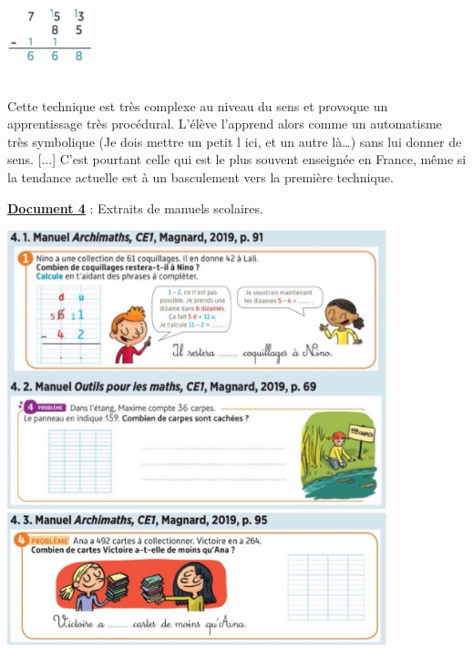 \begin{center}
\begin{minipage}{16cm}
      \quad
      \begin{minipage}{2.5cm}
         \includegraphics[width=2.5cm]{Nombres_et_calculs_did/Images/Num3_crpe_traditionnelle}
       \end{minipage} \\
      \textsf{Cette technique est très complexe au niveau du sens et provoque un apprentissage très procédural. L'élève l'apprend alors comme un automatisme très symbolique (\og Je dois mettre un petit l ici, et un autre là\dots \fg) sans lui donner de sens. [...] C'est pourtant celle qui est le plus souvent enseignée en France, même si la tendance actuelle est à un basculement vers la première technique.}  
   \end{minipage}
\end{center}

\smallskip


{\bf\uline{Document 4}} : Extraits de manuels scolaires.

\begin{center}
   \includegraphics[width=11cm]{Nombres_et_calculs_did/Images/Num3_crpe_archimaths_1} \\
   \includegraphics[width=11cm]{Nombres_et_calculs_did/Images/Num3_crpe_archimaths_2}
\end{center}

